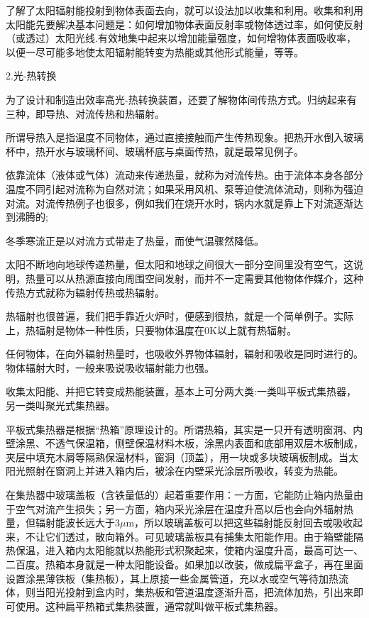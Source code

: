 \documentclass{ctexbook}
\begin{document}
了解了太阳辐射能投射到物体表面去向，就可以设法加以收集和利用。收集和利用太阳能先要解决基本问题是：如何增加物体表面反射率或物体透过率，如何使反射（或透过）太阳光线.有效地集中起来以增加能量强度，如何增物体表面吸收率，以便一尽可能多地使太阳辐射能转变为热能或其他形式能量，等等。

2.光-热转换

为了设计和制造出效率高光-热转换装置，还要了解物体间传热方式。归纳起来有三种，即导热、对流传热和热辐射。

所谓导热入是指温度不同物体，通过直接接触而产生传热现象。把热开水倒入玻璃杯中，热开水与玻璃杯间、玻璃杯底与桌面传热，就是最常见例子。

依靠流体（液体或气体）流动来传递热量，就称为对流传热。由于流体本身各部分温度不同引起对流称为自然对流；如果采用风机、泵等迫使流体流动，则称为强迫对流。对流传热例子也很多，例如我们在烧开水时，锅内水就是靠上下对流逐渐达到沸腾的;

冬季寒流正是以对流方式带走了热量，而使气温骤然降低。

太阳不断地向地球传递热量，但太阳和地球之间很大一部分空间里没有空气，这说明，热量可以从热源直接向周围空间发射，而并不一定需要其他物体作媒介，这种传热方式就称为辐射传热或热辐射。

热辐射也很普遍，我们把手靠近火炉时，便感到很热，就是一个简单例子。实际上，热辐射是物体一种性质，只要物体温度在0K以上就有热辐射。

任何物体，在向外辐射热量时，也吸收外界物体辐射，辐射和吸收是同时进行的。物体辐射大时，一般来吸说吸收辐射能力也强。

收集太阳能、并把它转变成热能装置，基本上可分两大类:一类叫平板式集热器，另一类叫聚光式集热器。

平板式集热器是根据“热箱”原理设计的。所谓热箱，其实是一只开有透明窗洞、内壁涂黑、不透气保温箱，侧壁保温材料木板，涂黑内表面和底部用双层木板制成，夹层中填充木屑等隔熟保温材料，窗洞（顶盖），用一块或多块玻璃板制成。当太阳光照射在窗洞上并进入箱内后，被涂在内壁采光涂层所吸收，转变为热能。

在集热器中玻璃盖板（含铁量低的）起着重要作用：一方面，它能防止箱内热量由于空气对流产生损失；另一方面，箱内采光涂层在温度升高以后也会向外辐射热量，但辐射能波长远大于3$\mu$m，所以玻璃盖板可以把这些辐射能反射回去或吸收起来，不让它们透过，散向箱外。可见玻璃盖板具有捕集太阳能作用。由于箱壁能隔热保温，进入箱内太阳能就以热能形式积聚起来，使箱内温度升高，最高可达一、二百度。热箱本身就是一种太阳能设备。如果加以改装，做成扁平盒子，再在里面设置涂黑薄铁板（集热板），其上原接一些金属管道，充以水或空气等待加热流体，则当阳光投射到盒内时，集热板和管道温度逐渐升高，把流体加热，引出来即可使用。这种扁平热箱式集热装置，通常就叫做平板式集热器。
\end{document}
